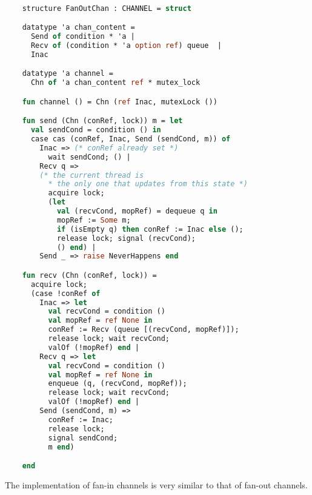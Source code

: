 \documentclass{article}
\begin{document}
  \begin{lstlisting}[language=ML, style=codestyle1, escapechar=\%]

    structure FanOutChan : CHANNEL = struct

    datatype 'a chan_content =
      Send of condition * 'a |
      Recv of (condition * 'a option ref) queue  |
      Inac

    datatype 'a channel =
      Chn of 'a chan_content ref * mutex_lock

    fun channel () = Chn (ref Inac, mutexLock ())

    fun send (Chn (conRef, lock)) m = let
      val sendCond = condition () in
      case cas (conRef, Inac, Send (sendCond, m)) of
        Inac => (* conRef already set *)
          wait sendCond; () |
        Recv q => 
        (* the current thread is
          * the only one that updates from this state *)
          acquire lock;
          (let
            val (recvCond, mopRef) = dequeue q in
            mopRef := Some m; 
            if (isEmpty q) then conRef := Inac else (); 
            release lock; signal (recvCond);
            () end) |
        Send _ => raise NeverHappens end

    fun recv (Chn (conRef, lock)) =
      acquire lock;
      (case !conRef of
        Inac => let
          val recvCond = condition ()
          val mopRef = ref None in
          conRef := Recv (queue [(recvCond, mopRef)]);
          release lock; wait recvCond;
          valOf (!mopRef) end |
        Recv q => let
          val recvCond = condition () 
          val mopRef = ref None in
          enqueue (q, (recvCond, mopRef));
          release lock; wait recvCond;
          valOf (!mopRef) end |
        Send (sendCond, m) =>
          conRef := Inac;
          release lock;
          signal sendCond;
          m end) 

    end 
  \end{lstlisting}

The implementation of fan-in channels is very similar to that of fan-out channels.
\end{document}
